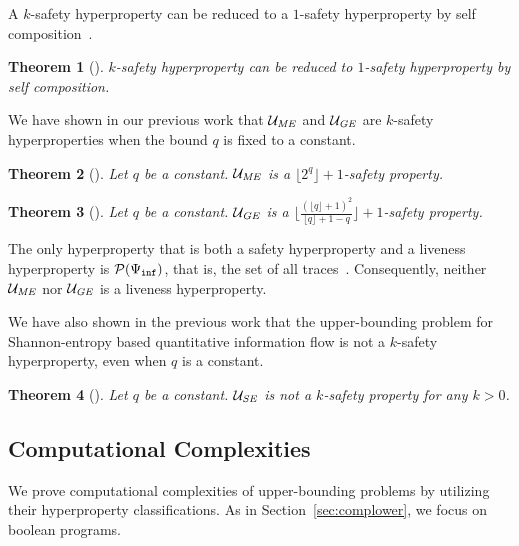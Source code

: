 \documentclass[]{eptcs}
\newtheorem{theorem}{Theorem}[section]
\begin{document}
A $k$-safety hyperproperty can be reduced to a $1$-safety
hyperproperty by self composition~\cite{barthe:csfw04,darvas:spc05}.
\begin{theorem}[\cite{DBLP:journals/jcs/ClarksonS10}]
  $k$-safety hyperproperty can be reduced to $1$-safety hyperproperty
  by self composition.
\end{theorem}

We have shown in our previous work that $\mathcal{U}_{\it ME}$ and
$\mathcal{U}_{\it GE}$ are $k$-safety hyperproperties when the bound
$q$ is fixed to a constant.
\begin{theorem}[\cite{DBLP:conf/esorics/YasuokaT10}]
\label{thm:umes}
Let $q$ be a constant.  ${\mathcal U}_{\it ME}$ is a $\lfloor
2^q\rfloor +1$-safety property.
\end{theorem}
\begin{theorem}[\cite{DBLP:conf/esorics/YasuokaT10}]
\label{thm:uges}
Let $q$ be a constant.  ${\mathcal U}_{\it GE}$ is a $\lfloor
\frac{(\lfloor q\rfloor +1)^2}{\lfloor q\rfloor +1 -q}\rfloor
+1$-safety property.
\end{theorem}

The only hyperproperty that is both a safety hyperproperty and a
liveness hyperproperty is $\mathcal{P}(\Psi_{\tt inf})$, that is, the
set of all traces~\cite{DBLP:journals/jcs/ClarksonS10}.  Consequently,
neither ${\mathcal U}_{\it ME}$ nor ${\mathcal U}_{\it GE}$ is a
liveness hyperproperty.

We have also shown in the previous work that the upper-bounding
problem for Shannon-entropy based quantitative information flow is not
a $k$-safety hyperproperty, even when $q$ is a constant.
\begin{theorem}[\cite{DBLP:conf/esorics/YasuokaT10}]
  Let $q$ be a constant.  ${\mathcal U}_{\it SE}$ is not a $k$-safety
  property for any $k>0$.
\end{theorem}

\subsection{Computational Complexities}
We prove computational complexities of upper-bounding problems by
utilizing their hyperproperty classifications.  As in
Section~\ref{sec:complower}, we focus on boolean programs.
\end{document}
